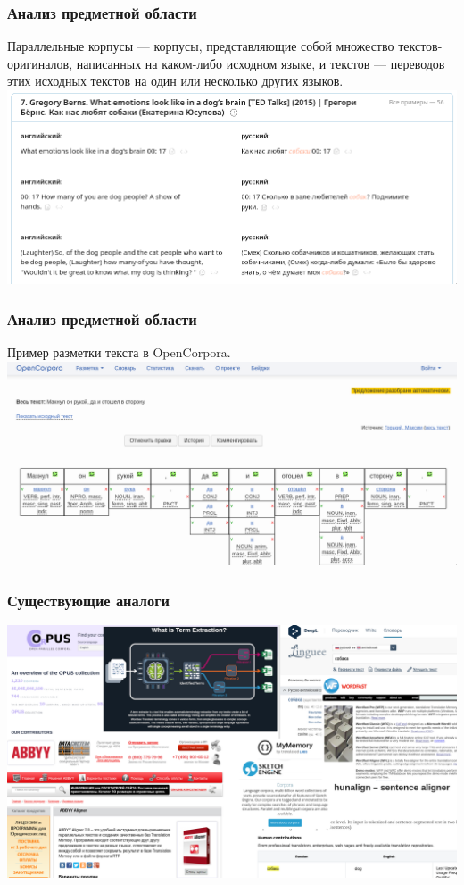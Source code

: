 \documentclass{beamer}
\begin{document}
\begin{frame}
    \frametitle{Анализ предметной области}
Параллельные корпусы — корпусы, представляющие собой множество текстов-оригиналов, написанных на каком-либо исходном языке, и текстов — переводов этих исходных текстов на один или несколько других языков.
    \vfill
    \centering
    \includegraphics[width=\textwidth]{img/parcor.png}
\end{frame}


\begin{frame}
    \frametitle{Анализ предметной области}
    Пример разметки текста в OpenCorpora.
    \vfill
    \centering
    \includegraphics[width=\textwidth]{img/opencorpora.png}
\end{frame}

\begin{frame}
    \frametitle{Существующие аналоги}
    \centering
	\includegraphics[width=\textwidth]{img/alternatives.png}
\end{frame}
\end{document}
